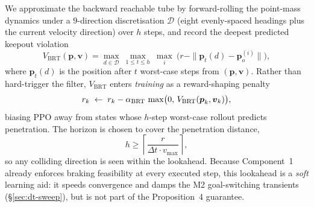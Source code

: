 \documentclass[letterpaper]{article}
\begin{document}
We approximate the backward reachable tube by forward-rolling the point-mass dynamics under a $9$-direction discretisation $\mathcal{D}$ (eight evenly-spaced headings plus the current velocity direction) over $h$ steps, and record the deepest predicted keepout violation
\begin{equation}
V_\text{BRT}(\boldsymbol{p},\boldsymbol{v}) = \max_{d \in \mathcal{D}}\ \max_{1\le t\le h}\ \max_i\ \bigl(r - \|\boldsymbol{p}_t(d) - \boldsymbol{p}_o^{(i)}\|\bigr),
\label{eq:brt}
\end{equation}
where $\boldsymbol{p}_t(d)$ is the position after $t$ worst-case steps from $(\boldsymbol{p},\boldsymbol{v})$. Rather than hard-trigger the filter, $V_\text{BRT}$ enters \emph{training} as a reward-shaping penalty
\begin{equation}
r_k \;\leftarrow\; r_k - \alpha_\text{BRT}\,\max\bigl(0,\,V_\text{BRT}(\boldsymbol{p}_k,\boldsymbol{v}_k)\bigr),
\notag
\end{equation}
biasing PPO away from states whose $h$-step worst-case rollout predicts penetration. The horizon is chosen to cover the penetration distance,
\begin{equation}
h \ge \left\lceil \frac{r}{\Delta t \cdot v_{\max}} \right\rceil,
\label{eq:h_cond}
\end{equation}
so any colliding direction is seen within the lookahead. Because Component~1 already enforces braking feasibility at every executed step, this lookahead is a \emph{soft} learning aid: it speeds convergence and damps the M2 goal-switching transients (\S\ref{sec:dt-sweep}), but is not part of the Proposition~4 guarantee.
\end{document}
